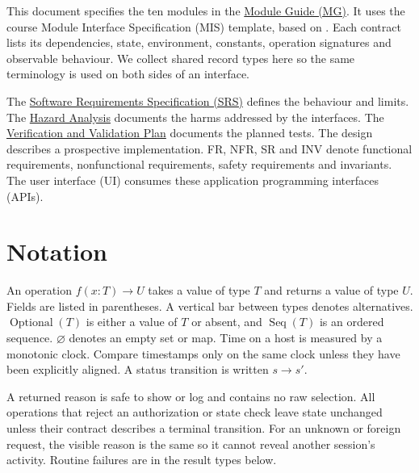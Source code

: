 \documentclass[12pt, titlepage]{article}
\newcommand{\pdfbase}{https://github.com/richy1337/Verity/blob/main/pdfs}
\begin{document}
This document specifies the ten modules in the
\href{\pdfbase/Design/SoftArchitecture/MG.pdf}{Module Guide (MG)}. It uses the course Module Interface Specification (MIS) template, based on \citet{HoffmanAndStrooper1995}. Each contract lists its dependencies, state, environment, constants, operation signatures and observable behaviour. We collect shared record types here so the same terminology is used on both sides of an interface.

The \href{\pdfbase/SRS/SRS.pdf}{Software Requirements Specification (SRS)} defines the behaviour and limits. The \href{\pdfbase/HazardAnalysis/HazardAnalysis.pdf}{Hazard Analysis} documents the harms addressed by the interfaces. The \href{\pdfbase/VnVPlan/VnVPlan.pdf}{Verification and Validation Plan} documents the planned tests. The design describes a prospective implementation. FR, NFR, SR and INV denote functional requirements, nonfunctional requirements, safety requirements and invariants. The user interface (UI) consumes these application programming interfaces (APIs).

\section{Notation}\label{sec:notation}

An operation $f(x:T)\to U$ takes a value of type $T$ and returns a value of type $U$. Fields are listed in parentheses. A vertical bar between types denotes alternatives. $\operatorname{Optional}(T)$ is either a value of $T$ or absent, and $\operatorname{Seq}(T)$ is an ordered sequence. $\varnothing$ denotes an empty set or map. Time on a host is measured by a monotonic clock. Compare timestamps only on the same clock unless they have been explicitly aligned. A status transition is written $s\to s'$.

A returned reason is safe to show or log and contains no raw selection. All operations that reject an authorization or state check leave state unchanged unless their contract describes a terminal transition. For an unknown or foreign request, the visible reason is the same so it cannot reveal another session's activity. Routine failures are in the result types below.
\end{document}
